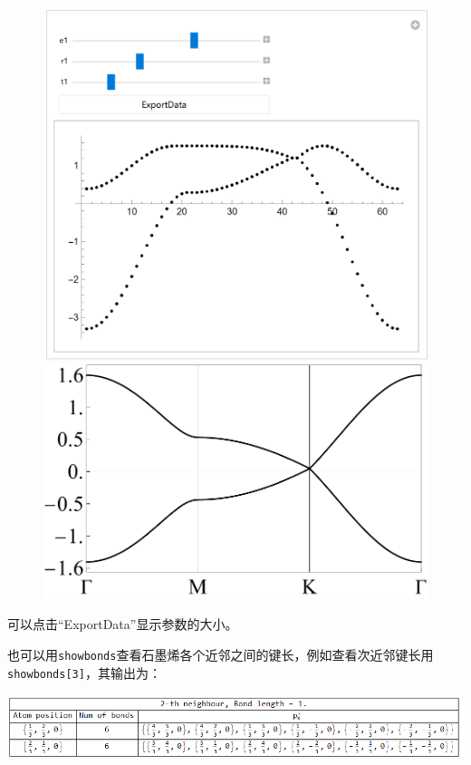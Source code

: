 \documentclass[titlepage,a4paper,12pt,AutoFakeBold]{article}
\begin{document}
\begin{figure}[H]
	\includegraphics[width=.45\textwidth]{./figures/bm}
	\includegraphics[width=.54\textwidth]{./figures/grabd}
\end{figure}
\noindent 可以点击“ExportData”显示参数的大小。


也可以用\lstinline|showbonds|查看石墨烯各个近邻之间的键长，例如查看次近邻键长用
\lstinline|showbonds[3]|，其输出为：
\begin{center}
\includegraphics[width=1.0\textwidth]{./figures/showbonds.png}
\end{center}
\end{document}
